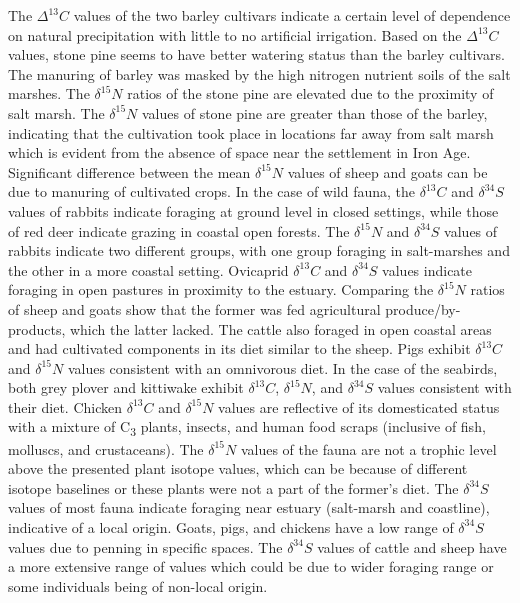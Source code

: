 \documentclass[preprint, 3p, authoryear]{elsarticle} %
\begin{document}
The \(\Delta ^{13}C\) values of the two barley cultivars indicate a certain level of dependence on natural precipitation with little to no artificial irrigation. Based on the \(\Delta ^{13}C\) values, stone pine seems to have better watering status than the barley cultivars. The manuring of barley was masked by the high nitrogen nutrient soils of the salt marshes. The \(\delta ^{15}N\) ratios of the stone pine are elevated due to the proximity of salt marsh. The \(\delta ^{15}N\) values of stone pine are greater than those of the barley, indicating that the cultivation took place in locations far away from salt marsh which is evident from the absence of space near the settlement in Iron Age. Significant difference between the mean \(\delta ^{15}N\) values of sheep and goats can be due to manuring of cultivated crops. In the case of wild fauna, the \(\delta ^{13}C\) and \(\delta ^{34}S\) values of rabbits indicate foraging at ground level in closed settings, while those of red deer indicate grazing in coastal open forests. The \(\delta ^{15}N\) and \(\delta ^{34}S\) values of rabbits indicate two different groups, with one group foraging in salt-marshes and the other in a more coastal setting. Ovicaprid \(\delta ^{13}C\) and \(\delta ^{34}S\) values indicate foraging in open pastures in proximity to the estuary. Comparing the \(\delta ^{15}N\) ratios of sheep and goats show that the former was fed agricultural produce/by-products, which the latter lacked. The cattle also foraged in open coastal areas and had cultivated components in its diet similar to the sheep. Pigs exhibit \(\delta ^{13}C\) and \(\delta ^{15}N\) values consistent with an omnivorous diet. In the case of the seabirds, both grey plover and kittiwake exhibit \(\delta ^{13}C\), \(\delta ^{15}N\), and \(\delta ^{34}S\) values consistent with their diet. Chicken \(\delta ^{13}C\) and \(\delta ^{15}N\) values are reflective of its domesticated status with a mixture of C\textsubscript{3} plants, insects, and human food scraps (inclusive of fish, molluscs, and crustaceans). The \(\delta ^{15}N\) values of the fauna are not a trophic level above the presented plant isotope values, which can be because of different isotope baselines or these plants were not a part of the former's diet. The \(\delta ^{34}S\) values of most fauna indicate foraging near estuary (salt-marsh and coastline), indicative of a local origin. Goats, pigs, and chickens have a low range of \(\delta ^{34}S\) values due to penning in specific spaces. The \(\delta ^{34}S\) values of cattle and sheep have a more extensive range of values which could be due to wider foraging range or some individuals being of non-local origin.
\end{document}
